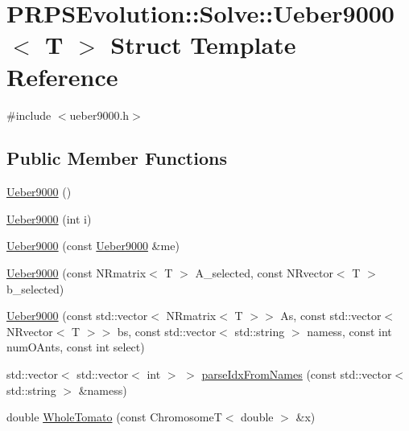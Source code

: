 \hypertarget{struct_p_r_p_s_evolution_1_1_solve_1_1_ueber9000}{\section{\-P\-R\-P\-S\-Evolution\-:\-:\-Solve\-:\-:\-Ueber9000$<$ \-T $>$ \-Struct \-Template \-Reference}
\label{struct_p_r_p_s_evolution_1_1_solve_1_1_ueber9000}
}


{\ttfamily \#include $<$ueber9000.\-h$>$}

\subsection*{\-Public \-Member \-Functions}
\begin{DoxyCompactItemize}
\item 
\hyperlink{struct_p_r_p_s_evolution_1_1_solve_1_1_ueber9000_ae2c12a52888f6059b224328409b3e2a9}{\-Ueber9000} ()
\item 
\hyperlink{struct_p_r_p_s_evolution_1_1_solve_1_1_ueber9000_a946c0cb7724f7e296ed406bb4d3200b0}{\-Ueber9000} (int i)
\item 
\hyperlink{struct_p_r_p_s_evolution_1_1_solve_1_1_ueber9000_a6e90ccb5ae732cacc451ed1453ce24a5}{\-Ueber9000} (const \hyperlink{struct_p_r_p_s_evolution_1_1_solve_1_1_ueber9000}{\-Ueber9000} \&me)
\item 
\hyperlink{struct_p_r_p_s_evolution_1_1_solve_1_1_ueber9000_ac24cbe267f00d303d08266f803eabeef}{\-Ueber9000} (const \-N\-Rmatrix$<$ \-T $>$ \-A\-\_\-selected, const \-N\-Rvector$<$ \-T $>$ b\-\_\-selected)
\item 
\hyperlink{struct_p_r_p_s_evolution_1_1_solve_1_1_ueber9000_a22491d3c3204fff3a8d98a126a0dc92f}{\-Ueber9000} (const std\-::vector$<$ \-N\-Rmatrix$<$ \-T $>$$>$ \-As, const std\-::vector$<$ \-N\-Rvector$<$ \-T $>$$>$ bs, const std\-::vector$<$ std\-::string $>$ namess, const int num\-O\-Ants, const int select)
\item 
std\-::vector$<$ std\-::vector$<$ int $>$ $>$ \hyperlink{struct_p_r_p_s_evolution_1_1_solve_1_1_ueber9000_a82c00da919dc772b9fed1d3a9fdd2fa7}{parse\-Idx\-From\-Names} (const std\-::vector$<$ std\-::string $>$ \&namess)
\item 
double \hyperlink{struct_p_r_p_s_evolution_1_1_solve_1_1_ueber9000_ae902391a995172a32a830d8393130c3d}{\-Whole\-Tomato} (const \-Chromosome\-T$<$ double $>$ \&x)
\item 

\end{DoxyCompactItemize}
